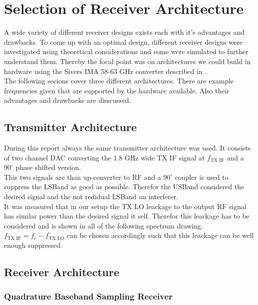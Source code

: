 \chapter{Selection of Receiver Architecture}
\label{chap:rx}

A wide variety of different receiver designs exists each with it's advantages
and drawbacks. To come up with an optimal design, different receiver designs
were investigated using theoretical considerations and some were simulated to
further understand them. Thereby the focal point was on architectures we could
build in hardware using the Sivers IMA 58-63 GHz converter described in
. \\

The following secions cover three different architectures. There are example
frequencies given that are supported by the hardware available. Also their
advantages and drawbacks are disscussed.

\section{Transmitter Architecture}
During this report always the same transmitter architecture was used.
It consists of two channel \gls{DAC} converting the 1.8 GHz wide
\gls{TX} \gls{IF} signal at $f_{\text{TX IF}}$ and a $90^\circ$ phase shifted
version. \\

This two signals are than up-converter to
\gls{RF} and a $90^\circ$ coupler is used to suppress the \gls{LSBand}
as good as possible.
Therefor the \gls{USBand} considered the desired signal and the
not redidual \gls{LSBand} an interferer. \\

It was measured that in our setup the \gls{TX} \gls{LO} leackage
to the output \gls{RF} signal has similar power than the desired
signal it self. Therefor this leackage has to be considered and is
shown in all of the following spectrum drawing.
$f_{\text{TX IF}} = f_{\text{c}} - f_{\text{TX LO}}$ can be chosen accordingly
such that this leackage can be well enough suppressed.

\section{Receiver Architecture}
\subsection{Quadrature Baseband Sampling Receiver}
\label{sec:rx_0}

